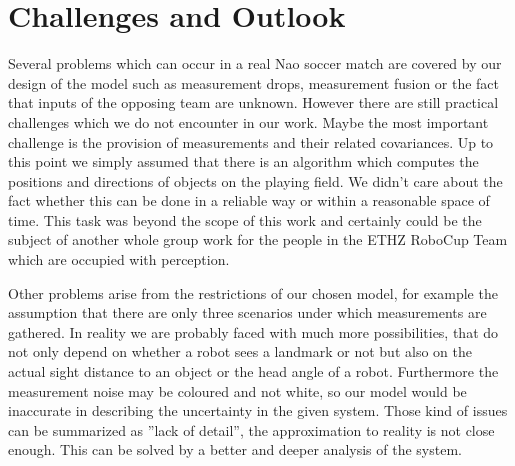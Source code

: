 
\chapter{Challenges and Outlook}

Several problems which can occur in a real Nao soccer match are covered by our design of the model such as measurement drops, measurement fusion or the fact that inputs of the opposing team are unknown. However there are still practical challenges which we do not encounter in our work. Maybe the most important challenge is the provision of measurements and their related covariances. Up to this point we simply assumed that there is an algorithm which computes the positions and directions of objects on the playing field. We didn't care about the fact whether this can be done in a reliable way or within a reasonable space of time. This task was beyond the scope of this work and certainly could be the subject of another whole group work for the people in the ETHZ RoboCup Team which are occupied with perception.
\parskip 0pt

Other problems arise from the restrictions of our chosen model, for example the assumption that there are only three scenarios under which measurements are gathered. In reality we are probably faced with much more possibilities, that do not only depend on whether a robot sees a landmark or not but also on the actual sight distance to an object or the head angle of a robot. Furthermore the measurement noise may be coloured and not white, so our model would be inaccurate in describing the uncertainty in the given system. Those kind of issues can be summarized as ''lack of detail'', the approximation to reality is not close enough. This can be solved by a better and deeper analysis of the system.


